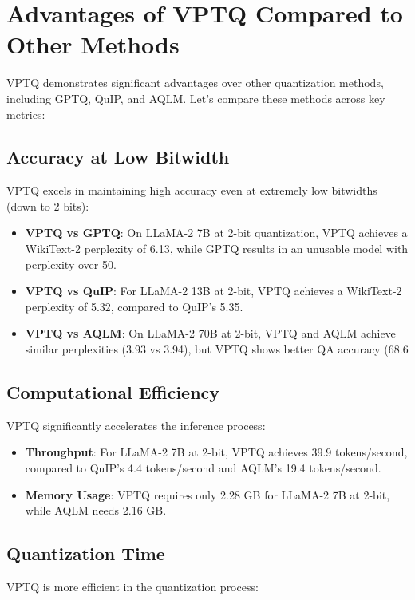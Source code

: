 \documentclass{article}
\begin{document}
\section{Advantages of VPTQ Compared to Other Methods}

VPTQ demonstrates significant advantages over other quantization methods, including GPTQ, QuIP, and AQLM. Let's compare these methods across key metrics:

\subsection{Accuracy at Low Bitwidth}
VPTQ excels in maintaining high accuracy even at extremely low bitwidths (down to 2 bits):

\begin{itemize}
    \item \textbf{VPTQ vs GPTQ}: On LLaMA-2 7B at 2-bit quantization, VPTQ achieves a WikiText-2 perplexity of 6.13, while GPTQ results in an unusable model with perplexity over 50.
    \item \textbf{VPTQ vs QuIP}: For LLaMA-2 13B at 2-bit, VPTQ achieves a WikiText-2 perplexity of 5.32, compared to QuIP's 5.35.
    \item \textbf{VPTQ vs AQLM}: On LLaMA-2 70B at 2-bit, VPTQ and AQLM achieve similar perplexities (3.93 vs 3.94), but VPTQ shows better QA accuracy (68.6%
\end{itemize}

\subsection{Computational Efficiency}
VPTQ significantly accelerates the inference process:

\begin{itemize}
    \item \textbf{Throughput}: For LLaMA-2 7B at 2-bit, VPTQ achieves 39.9 tokens/second, compared to QuIP's 4.4 tokens/second and AQLM's 19.4 tokens/second.
    \item \textbf{Memory Usage}: VPTQ requires only 2.28 GB for LLaMA-2 7B at 2-bit, while AQLM needs 2.16 GB.
\end{itemize}

\subsection{Quantization Time}
VPTQ is more efficient in the quantization process:
\end{document}
